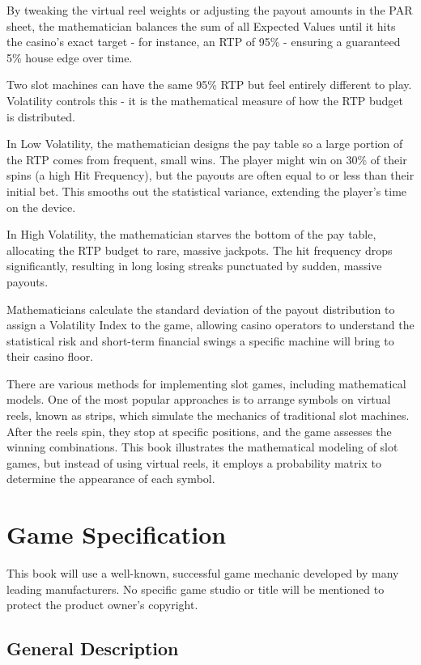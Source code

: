 \documentclass[12pt,twoside,openany]{book}
\begin{document}
By tweaking the virtual reel weights or adjusting the payout amounts in the PAR sheet, the mathematician balances the sum of all Expected Values until it hits the casino's exact target - for instance, an RTP of 95\% - ensuring a guaranteed 5\% house edge over time.

Two slot machines can have the same 95\% RTP but feel entirely different to play. Volatility controls this - it is the mathematical measure of how the RTP budget is distributed.

In Low Volatility, the mathematician designs the pay table so a large portion of the RTP comes from frequent, small wins. The player might win on 30\% of their spins (a high Hit Frequency), but the payouts are often equal to or less than their initial bet. This smooths out the statistical variance, extending the player's time on the device.

In High Volatility, the mathematician starves the bottom of the pay table, allocating the RTP budget to rare, massive jackpots. The hit frequency drops significantly, resulting in long losing streaks punctuated by sudden, massive payouts.

Mathematicians calculate the standard deviation of the payout distribution to assign a Volatility Index to the game, allowing casino operators to understand the statistical risk and short-term financial swings a specific machine will bring to their casino floor.

There are various methods for implementing slot games, including mathematical models. One of the most popular approaches is to arrange symbols on virtual reels, known as strips, which simulate the mechanics of traditional slot machines. After the reels spin, they stop at specific positions, and the game assesses the winning combinations. This book illustrates the mathematical modeling of slot games, but instead of using virtual reels, it employs a probability matrix to determine the appearance of each symbol.

\chapter{Game Specification}

This book will use a well-known, successful game mechanic developed by many leading manufacturers. No specific game studio or title will be mentioned to protect the product owner's copyright.

\section{General Description}
\end{document}
